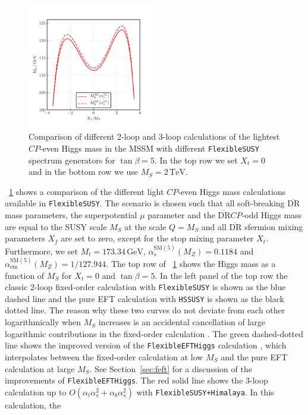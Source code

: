 \documentclass[final,3p,11pt,pdflatex]{elsarticle}
\makeatletter
\newcommand{\modelname}[1]{\texttt{#1}\@\xspace}
\newcommand{\fs}{\texttt{FlexibleSUSY}\@\xspace}
\newcommand{\HSSUSY}{\modelname{HSSUSY}}
\newcommand{\Himalaya}{\texttt{Himalaya}\@\xspace}
\newcommand{\fsh}{\texttt{FlexibleSUSY+}\Himalaya\xspace}
\newcommand{\feft}{\texttt{Flex\-ib\-le\-EFT\-Higgs}\@\xspace}
\newcommand{\ol}[1]{\overline{#1}}
\newcommand{\DRbar}{\ensuremath{\ol{\text{DR}}}\xspace}
\newcommand{\unit}[1]{\,\text{#1}}      %
\newcommand{\SM}{\ensuremath{\text{SM}}\xspace}
\newcommand{\MS}{\ensuremath{M_S}\xspace}
\newcommand{\figref}[1]{\figurename~\ref{#1}}
\newcommand{\secref}[1]{Section~\ref{#1}}
\newcommand{\CP}{\ensuremath{CP}\xspace}
\def\at{\alpha_t}
\def\ab{\alpha_b}
\def\as{\alpha_s}
\def\aem{\alpha_{\text{em}}}
\makeatother
\begin{document}
\begin{figure}[h!]
  \includegraphics[width=0.49\textwidth]{doc/manuals/plots/Himalaya/scan_Mh_Xt_TB-5_MS-2000_delta_alpha}
  \caption{Comparison of different 2-loop and 3-loop calculations of
    the lightest \CP-even Higgs mass in the MSSM with different \fs
    spectrum generators for $\tan\beta = 5$.  In the top row we set
    $X_t = 0$ and in the bottom row we use $\MS = 2\unit{TeV}$.}
  \label{fig:Mh-himalaya}
\end{figure}
%
\figref{fig:Mh-himalaya} shows a comparison of the different light
\CP-even Higgs mass calculations available in \fs.  The scenario is
chosen such that all soft-breaking \DRbar mass parameters, the
superpotential
$\mu$ parameter and the \DRbar \CP-odd Higgs mass are equal to the SUSY
scale $\MS$ at the scale $Q =
\MS$ and all \DRbar sfermion mixing parameters
$X_f$ are set to zero, except for the stop mixing parameter
$X_t$.  Furthermore, we set $M_t =
173.34\unit{GeV}$, $\as^{\SM(5)}(M_Z) =
0.1184$ and $\aem^{\SM(5)}(M_Z) =
1/127.944$.  The top row of \figref{fig:Mh-himalaya} shows the Higgs
mass as a function of $\MS$ for $X_t = 0$ and $\tan\beta =
5$.  In the left panel of the top row the classic 2-loop fixed-order
calculation with \fs \cite{Athron:2014yba} is shown as the blue dashed
line and the pure EFT calculation with \HSSUSY is shown as the black
dotted line.  The reason why these two curves do not deviate from each
other logarithmically when
$\MS$ increases is an accidental cancellation of large
logarithmic contributions in the fixed-order calculation
\cite{Athron:2016fuq}.  The green dashed-dotted line shows the
improved version of the \feft calculation \cite{Athron:2016fuq}, which
interpolates
between the fixed-order calculation at low \MS and the pure EFT
calculation at large \MS.  See \secref{sec:feft} for a discussion of
the improvements of \feft.  The red solid line shows the 3-loop
calculation up to $O(\at\as^2 +
\ab\as^2)$ with \fsh \cite{Harlander:2017kuc}.  In this calculation, the
\end{document}
